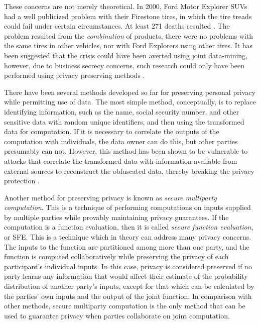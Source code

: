 These concerns are not merely theoretical. In 2000, Ford Motor Explorer
SUVs had a well publicized problem with their Firestone tires, in
which the tire treads could fail under certain circumstances. At least
271 deaths resulted \cite{NYTFordFirestone}. The problem resulted
from the \emph{combination} of products, \ie there were no problems with
the same tires in other vehicles, nor with Ford Explorers using other
tires. It has been suggested that the crisis could have been averted
using joint data-mining, however, due to business secrecy concerns,
such research could only have been performed using privacy preserving methods
\cite{VaidyaClifton:2002}.

There have been several methods developed so far for preserving personal
privacy while permitting use of data. The most simple method, conceptually,
is to replace identifying information, such as the name, social security
number, and other sensitive data with random unique identifiers, and
then using the transformed data for computation. If it is necessary
to correlate the outputs of the computation with individuals, the
data owner can do this, but other parties presumably can not. However,
this method has been shown to be vulnerable to attacks that correlate
the transformed data with information available from external sources
to reconstruct the obfuscated data, thereby breaking the privacy protection
\cite{Malin04}. 

Another method for preserving privacy is known as \emph{secure multiparty
computation}\cite{Yao86}. This is a technique of performing computations on inputs
supplied by multiple parties while provably maintaining privacy guarantees.
If the computation is a function evaluation, then it is called \emph{secure
function evaluation}, or SFE. This is a technique which in theory can address
many privacy concerns. The inputs to
the function are partitioned among more than one party, and the function
is computed collaboratively while preserving the privacy of each participant's
individual inputs. In this case, privacy is considered preserved if
no party learns any information that would affect their estimate of
the probability distribution of another party's inputs, except for
that which can be calculated by the parties' own inputs and the output
of the joint function. In comparison with other methods, secure
multiparty computation is the only method that can be used to guarantee privacy when parties
collaborate on joint computation. %
\begin{comment}
%
\begin{lyxgreyedout}
Needs clarification
\end{lyxgreyedout}
 In other words, the entropy gain of each party is equivalent to the
entropy gain in an idealized protocol where a trusted third party
collects all the inputs, evaluates the function, and transmits only
the output to each party. Depending on the protocol, the guarantees
for some parties may be based on typical assumptions of computational
hardness, while the guarantees for other parties may be information
theoretic.
\end{comment}
{}

